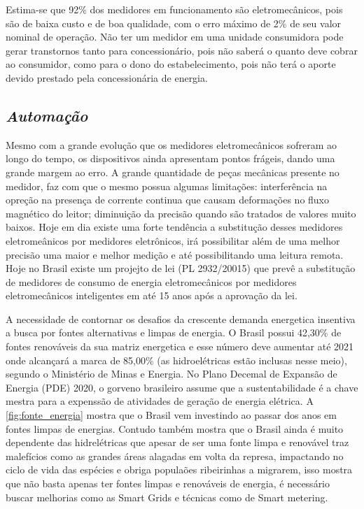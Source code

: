 Estima-se que 92\% dos medidores em funcionamento são eletromecânicos, pois são de baixa custo e de boa qualidade, com o erro máximo de 2\% de seu valor
nominal de operação. Não ter um medidor em uma unidade consumidora pode gerar transtornos tanto para concessionário, pois não saberá o quanto deve cobrar ao 
consumidor, como para o dono do estabelecimento, pois não terá o aporte devido prestado pela concessionária de energia.

\subsection[\textit{Automação}]{\textit{Automação}}\label{automacao}
Mesmo com a grande evolução que os medidores eletromecânicos sofreram ao longo do tempo, os dispositivos ainda apresentam pontos frágeis, dando uma 
grande margem ao erro. A grande quantidade de peças mecânicas presente no medidor, faz com que o mesmo possua algumas limitações: interferência na
opreção na presença de corrente continua que causam deformações no fluxo magnético do leitor; diminuição da precisão quando são tratados de valores
muito baixos. Hoje em dia existe uma forte tendência a substitução desses medidores eletromeânicos por medidores eletrônicos, irá possibilitar além de uma
melhor precisão uma maior e melhor medição e até possibilitando uma leitura remota. Hoje no Brasil existe um projejto de lei (PL 2932/20015) que prevê
a substitução de medidores de consumo de energia eletromecânicos por medidores eletromecânicos inteligentes em até 15 anos após a aprovação da lei.


A necessidade de contornar os desafios da crescente demanda energetica insentiva a busca por fontes alternativas e limpas de energia. O Brasil 
possui 42,30\% de fontes renováveis da sua matriz energetica e esse número deve aumentar até 2021 onde alcançará a marca de 85,00\% (as hidroelétricas
estão inclusas nesse meio), segundo o Ministério de Minas e Energia. No Plano Decemal de Expansão de Energia (PDE) 2020, o gorveno brasileiro
assume que a sustentabilidade é a chave mestra para a expenssão de atividades de geração de energia elétrica. A \autoref{fig:fonte_energia} mostra
que o Brasil vem investindo ao passar dos anos em fontes limpas de energias. Contudo também mostra que o Brasil ainda é muito dependente das 
hidrelétricas que apesar de ser uma fonte limpa e renovável traz malefícios como as grandes áreas alagadas em volta da represa, impactando no
ciclo de vida das espécies e obriga populaões ribeirinhas a migrarem, isso mostra que não basta apenas ter fontes limpas
e renováveis de energia, é necessário buscar melhorias como as Smart Grids e técnicas como de Smart metering.

